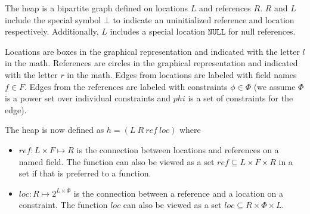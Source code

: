 The heap is a bipartite graph defined on locations $L$ and references
$R$. $R$ and $L$ include the special symbol $\bot$ to indicate an
uninitialized reference and location respectively. Additionally, $L$
includes a special location $\mathtt{NULL}$ for null references.

Locations are boxes in the graphical representation and indicated with
the letter $l$ in the math. References are circles in the graphical
representation and indicated with the letter $r$ in the math. Edges
from locations are labeled with field names $f \in F$. Edges from the
references are labeled with constraints $\phi \in \Phi$ (we assume
$\Phi$ is a power set over individual constraints and $phi$ is a set
of constraints for the edge).

The heap is now defined
as $h = (L\ R\ \mathit{ref}\ \mathit{loc})$ where
\begin{itemize}
\item $\mathit{ref} : L \times F \mapsto R$ is the
  connection between locations and references on a named field. The
  function can also be viewed as a set $\mathit{ref} \subseteq L
  \times F \times R$ in a set if that is preferred to a function.
\item $\mathit{loc} : R \mapsto 2^{L \times \Phi}$ is the connection
  between a reference and a location on a constraint. The function
  $\mathit{loc}$ can also be viewed as a set $\mathit{loc} \subseteq R
  \times \Phi \times L$.
\end{itemize}





\begin{comment}
\begin{algorithm}
 \SetAlgoLined
 \KwData{this text}
 \KwResult{how to write algorithm with \LaTeX2e }
 initialization\;
 \While{not at end of this document $\wedge x < 2$}{
  read current\;
  \eIf{understand}{
   go to next section\;
   current section becomes this one\;
   }{
   go back to the beginning of current section\;
  }
 }
 \caption{How to write algorithms}
\end{algorithm}
\end{comment}
